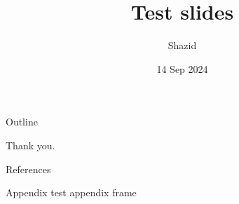 \documentclass[12pt, aspectratio=169]{beamer}
\title{Test slides}
\date{14 Sep 2024}
\author{Shazid}
\begin{document}
	{
		\addtocounter{framenumber}{-2}    %

		\begin{frame}
			\titlepage
		\end{frame}

		\begin{frame}{Outline}
			\tableofcontents[subsectionstyle=hide]
		\end{frame}
	}

	
	
	\begin{frame}
		\centering \Huge Thank you.
	\end{frame}

	\appendix

	\begingroup
		\renewcommand{\section}[2]{}%
		\begin{frame}[allowframebreaks]{References}
				\def\bibfont{\footnotesize}
				
		\end{frame}
	\endgroup

    \begin{frame}{Appendix}
        test appendix frame
    \end{frame}
\end{document}
